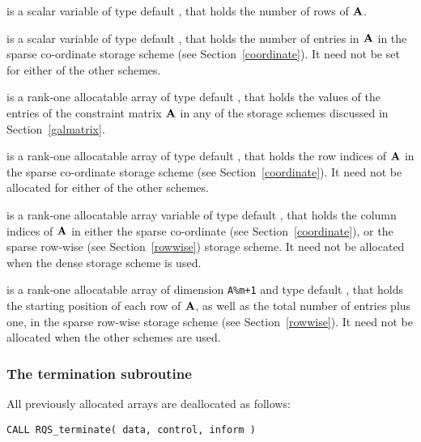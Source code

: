 \documentclass{galahad}
\newcommand{\packagename}{RQS}
\begin{document}
\begin{description}
\begin{description}
 is a scalar variable of type default \integer, that
holds the number of rows of ${\mathbf{A}}$.

 is a scalar variable of type default \integer, that
holds the number of entries in ${\mathbf{A}}$
in the sparse co-ordinate storage scheme (see Section~\ref{coordinate}).
It need not be set for either of the other schemes.

 is a rank-one allocatable array of type default \realdp, that holds
the values of the entries of the constraint matrix ${\mathbf{A}}$ in any of the
storage schemes discussed in Section~\ref{galmatrix}.

 is a rank-one allocatable array of type default \integer,
that holds the row indices of ${\mathbf{A}}$ in the sparse co-ordinate storage
scheme (see Section~\ref{coordinate}).
It need not be allocated for either of the other schemes.

 is a rank-one allocatable array variable of type default \integer,
that holds the column indices of ${\mathbf{A}}$ in either the sparse co-ordinate
(see Section~\ref{coordinate}), or the sparse row-wise
(see Section~\ref{rowwise}) storage scheme.
It need not be allocated when the dense storage scheme is used.

 is a rank-one allocatable array of dimension {\tt A\%m+1} and type
default \integer, that holds the starting position of
each row of ${\mathbf{A}}$, as well
as the total number of entries plus one, in the sparse row-wise storage
scheme (see Section~\ref{rowwise}). It need not be allocated when the
other schemes are used.
\end{description}

\end{description}


\subsubsection{The  termination subroutine}
All previously allocated arrays are deallocated as follows:

\hskip0.5in
{\tt CALL \packagename\_terminate( data, control, inform )}
\end{document}
